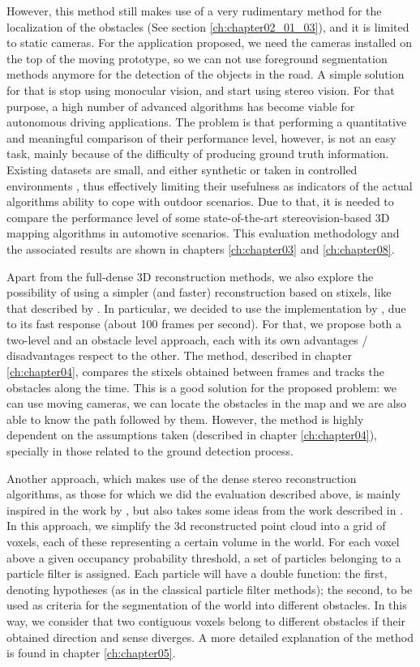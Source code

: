 However, this method still makes use of a very rudimentary method for the localization of the obstacles (See section \ref{ch:chapter02_01_03}), and it is limited to static cameras. For the application proposed, we need the cameras installed on the top of the moving prototype, so we can not use foreground segmentation methods anymore for the detection of the objects in the road. A simple solution for that is stop using monocular vision, and start using stereo vision. For that purpose, a high number of advanced algorithms has become viable for autonomous driving applications. The problem is that performing a quantitative and meaningful comparison of their performance level, however, is not an easy task, mainly because of the difficulty of producing ground truth information. Existing datasets are small, and either synthetic or taken in controlled environments \citep{Scharstein2002}, thus effectively limiting their usefulness as indicators of the actual algorithms ability to cope with outdoor scenarios. Due to that, it is needed to compare the performance level of some state-of-the-art stereovision-based 3D mapping algorithms in automotive scenarios. This evaluation methodology and the associated results are shown in chapters \ref{ch:chapter03} and \ref{ch:chapter08}.

Apart from the full-dense 3D reconstruction methods, we also explore the possibility of using a simpler (and faster) reconstruction based on stixels, like that described by \cite{badino2009stixel}. In particular, we decided to use the implementation by \cite{benenson2012pedestrian}, due to its fast response (about 100 frames per second). For that, we propose both a two-level and an obstacle level approach, each with its own advantages / disadvantages respect to the other. The method, described in chapter \ref{ch:chapter04}, compares the stixels obtained between frames and tracks the obstacles along the time. This is a good solution for the proposed problem: we can use moving cameras, we can locate the obstacles in the map and we are also able to know the path followed by them. However, the method is highly dependent on the assumptions taken (described in chapter \ref{ch:chapter04}), specially in those related to the ground detection process.

Another approach, which makes use of the dense stereo reconstruction algorithms, as those for which we did the evaluation described above, is mainly inspired in the work by \cite{danescu2012particle}, but also takes some ideas from the work described in \cite{broggi2013}. In this approach, we simplify the 3d reconstructed point cloud into a grid of voxels, each of these representing a certain volume in the world. For each voxel above a given occupancy probability threshold, a set of particles belonging to a particle filter is assigned. Each particle will have a double function: the first, denoting hypotheses (as in the classical particle filter methods); the second, to be used as criteria for the segmentation of the world into different obstacles. In this way, we consider that two contiguous voxels belong to different obstacles if their obtained direction and sense diverges. A more detailed explanation of the method is found in chapter \ref{ch:chapter05}.

